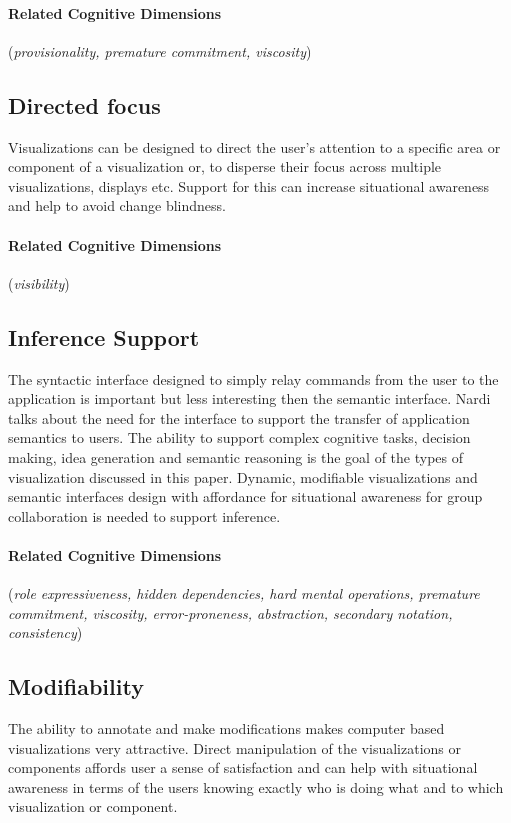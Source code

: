 \documentclass{sig-alternate}
\begin{document}
\paragraph{Related Cognitive Dimensions}
(\emph{provisionality, premature commitment, viscosity})
\subsection{Directed focus}
Visualizations can be designed to direct the user's attention to a specific area
or component of a visualization or, to disperse their focus across multiple
visualizations, displays etc. Support for this can increase situational
awareness and help to avoid change blindness.
\paragraph{Related Cognitive Dimensions}
(\emph{visibility})
\subsection{Inference Support}
The syntactic interface designed to simply relay commands from the user to the
application is important but less interesting then the semantic interface. Nardi
talks about the need for the interface to support the transfer of application
semantics to users. The ability to support complex cognitive tasks, decision
making, idea generation and semantic reasoning is the goal of the types of
visualization discussed in this paper. Dynamic, modifiable visualizations and
semantic interfaces design with affordance for situational awareness for group
collaboration is needed to support inference.
\paragraph{Related Cognitive Dimensions}
(\emph{role expressiveness, hidden dependencies, hard mental operations,
premature commitment, viscosity, error-proneness, abstraction, secondary
notation, consistency})
\subsection{Modifiability}
The ability to annotate and make modifications makes computer based
visualizations very attractive. Direct manipulation of the visualizations or
components affords user a sense of satisfaction and can help with situational
awareness in terms of the users knowing exactly who is doing what and to which
visualization or component.
\end{document}

